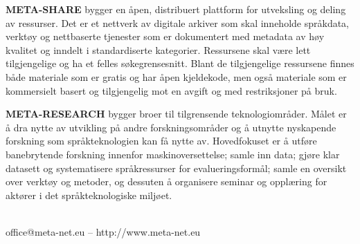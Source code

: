\begin{multicols}{2}
\textbf{META-SHARE} bygger en åpen, distribuert plattform for utveksling og deling av ressurser. Det er et nettverk av digitale arkiver som skal inneholde språkdata, verktøy og nettbaserte tjenester som er dokumentert med metadata av høy kvalitet og inndelt i standardiserte kategorier. Ressursene skal være lett tilgjengelige og ha et felles søkegrensesnitt. Blant de tilgjengelige ressursene finnes både materiale som er gratis og har åpen kjeldekode, men også materiale som er kommersielt basert og tilgjengelig mot en avgift og med restriksjoner på bruk. 

\textbf{META-RESEARCH} bygger broer til tilgrensende teknologiområder. Målet er å dra nytte av utvikling på andre forskningsområder og å utnytte nyskapende forskning som språkteknologien kan få nytte av. Hovedfokuset er å utføre banebrytende forskning innenfor maskinoversettelse; samle inn data; gjøre klar datasett og systematisere språkressurser for evalueringsformål; samle en oversikt over verktøy og metoder, og dessuten å organisere seminar og opplæring for aktører i det språkteknologiske miljøet.\\ \ \\ 

\centerline{office@meta-net.eu -- http://www.meta-net.eu}
\end{multicols}

\makeatletter
{}
{
  \renewcommand*{\theHsection}{\thepart.\thesection}
}
\makeatother

\setcounter{section}{0}
\setcounter{figure}{0}



\cleardoublepage


